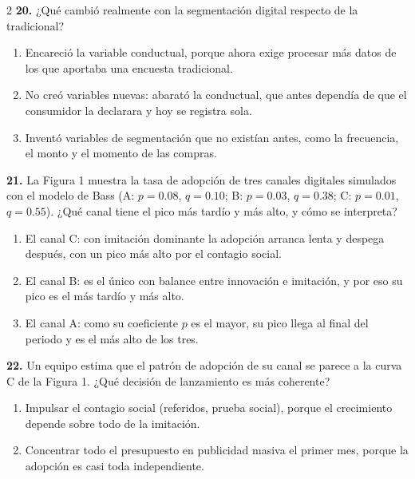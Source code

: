 \documentclass[10pt,letterpaper]{article}
\begin{document}
\begin{multicols}{2}
\vspace{2pt}
\noindent\textbf{20.} ¿Qué cambió realmente con la segmentación digital respecto de la tradicional?
\vspace{-3pt}
\begin{enumerate}[label=\alph*),leftmargin=1.1em,itemsep=0pt,topsep=1pt,parsep=0pt,partopsep=0pt]
\item Encareció la variable conductual, porque ahora exige procesar más datos de los que aportaba una encuesta tradicional.
\item No creó variables nuevas: abarató la conductual, que antes dependía de que el consumidor la declarara y hoy se registra sola.
\item Inventó variables de segmentación que no existían antes, como la frecuencia, el monto y el momento de las compras.
\end{enumerate}
\vspace{2pt}
\noindent\textbf{21.} La Figura 1 muestra la tasa de adopción de tres canales digitales simulados con el modelo de Bass (A: $p=0.08$, $q=0.10$; B: $p=0.03$, $q=0.38$; C: $p=0.01$, $q=0.55$). ¿Qué canal tiene el pico más tardío y más alto, y cómo se interpreta?
\vspace{-3pt}
\begin{enumerate}[label=\alph*),leftmargin=1.1em,itemsep=0pt,topsep=1pt,parsep=0pt,partopsep=0pt]
\item El canal C: con imitación dominante la adopción arranca lenta y despega después, con un pico más alto por el contagio social.
\item El canal B: es el único con balance entre innovación e imitación, y por eso su pico es el más tardío y más alto.
\item El canal A: como su coeficiente $p$ es el mayor, su pico llega al final del periodo y es el más alto de los tres.
\end{enumerate}
\vspace{2pt}
\noindent\textbf{22.} Un equipo estima que el patrón de adopción de su canal se parece a la curva C de la Figura 1. ¿Qué decisión de lanzamiento es más coherente?
\vspace{-3pt}
\begin{enumerate}[label=\alph*),leftmargin=1.1em,itemsep=0pt,topsep=1pt,parsep=0pt,partopsep=0pt]
\item Impulsar el contagio social (referidos, prueba social), porque el crecimiento depende sobre todo de la imitación.
\item Concentrar todo el presupuesto en publicidad masiva el primer mes, porque la adopción es casi toda independiente.

\end{enumerate}
\end{multicols}
\end{document}
